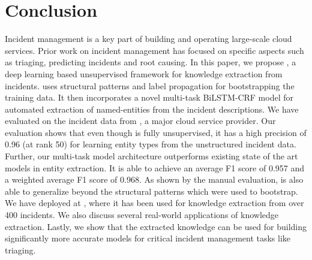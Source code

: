 \section{Conclusion}
Incident management is a key part of building and operating large-scale cloud services. Prior work on incident management has focused on specific aspects such as triaging, predicting incidents and root causing. In this paper, we propose \softner{}, a deep learning based unsupervised framework for knowledge extraction from incidents. \softner{} uses structural patterns and label propagation for bootstrapping the training data. It then incorporates a novel multi-task BiLSTM-CRF model for automated extraction of named-entities from the incident descriptions. We have evaluated \softner{} on the incident data from \CompanyX{}, a major cloud service provider. Our evaluation shows that even though \softner{} is fully unsupervised, it has a high precision of 0.96 (at rank 50) for learning entity types from the unstructured incident data. Further, our multi-task model architecture outperforms existing state of the art models in entity extraction. It is able to achieve an average F1 score of 0.957 and a weighted average F1 score of 0.968. As shown by the manual evaluation, \softner{} is also able to generalize beyond the structural patterns which were used to bootstrap. We have deployed \softner{} at \CompanyX{}, where it has been used for knowledge extraction from over 400 incidents. We also discuss several real-world applications of knowledge extraction. Lastly, we show that the extracted knowledge can be used for building significantly more accurate models for critical incident management tasks like triaging.